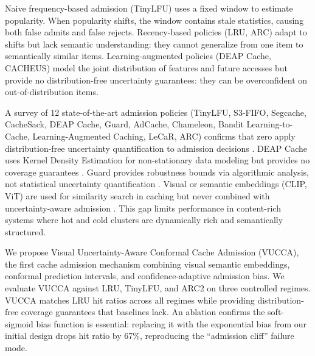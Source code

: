 \documentclass[11pt,letterpaper]{article}
\begin{document}
Naive frequency-based admission (TinyLFU) \citep{Einziger2017} uses a fixed window to estimate popularity. When popularity shifts, the window contains stale statistics, causing both false admits and false rejects. Recency-based policies (LRU, ARC) \citep{Megiddo2003} adapt to shifts but lack semantic understanding: they cannot generalize from one item to semantically similar items. Learning-augmented policies (DEAP Cache, CACHEUS) \citep{Mangal2020} model the joint distribution of features and future accesses but provide no distribution-free uncertainty guarantees: they can be overconfident on out-of-distribution items.

A survey of 12 state-of-the-art admission policies (TinyLFU, S3-FIFO, Segcache, CacheSack, DEAP Cache, Guard, AdCache, Chameleon, Bandit Learning-to-Cache, Learning-Augmented Caching, LeCaR, ARC) confirms that zero apply distribution-free uncertainty quantification to admission decisions \citep{Einziger2017,Yang2023,Megiddo2003,Mangal2020,Chen2025,Iliakopoulou2024,Bura2020}. DEAP Cache uses Kernel Density Estimation for non-stationary data modeling but provides no coverage guarantees \citep{Mangal2020}. Guard provides robustness bounds via algorithmic analysis, not statistical uncertainty quantification \citep{Chen2025}. Visual or semantic embeddings (CLIP, ViT) are used for similarity search in caching but never combined with uncertainty-aware admission \citep{Dosovitskiy2021}. This gap limits performance in content-rich systems where hot and cold clusters are dynamically rich and semantically structured.

We propose Visual Uncertainty-Aware Conformal Cache Admission (VUCCA), the first cache admission mechanism combining visual semantic embeddings, conformal prediction intervals, and confidence-adaptive admission bias. We evaluate VUCCA against LRU, TinyLFU, and ARC2 on three controlled regimes. VUCCA matches LRU hit ratios across all regimes while providing distribution-free coverage guarantees that baselines lack. An ablation confirms the soft-sigmoid bias function is essential: replacing it with the exponential bias from our initial design drops hit ratio by 67\%, reproducing the ``admission cliff'' failure mode.
\end{document}
